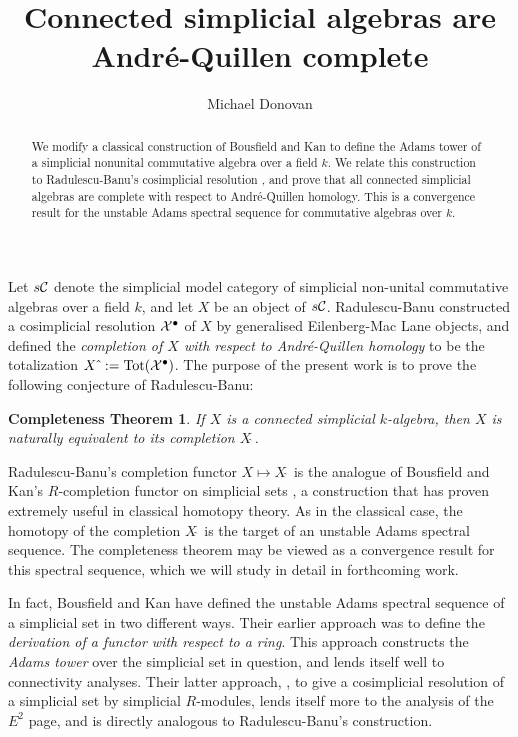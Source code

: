 \documentclass[11pt]{amsart}
\title{Connected simplicial algebras are Andr\'e-Quillen complete}
\author{Michael Donovan}
\theoremstyle{plain}
\newtheorem*{completenesstheorem}{Completeness Theorem}
\begin{document}
\maketitle

\begin{abstract}
We modify a classical construction of Bousfield and Kan \cite{BousKanSSeq.pdf} to define the Adams tower of a simplicial nonunital commutative algebra over a field $k$. We relate this construction to Radulescu-Banu's cosimplicial resolution \cite{Radulescu-Banu.pdf}, and prove that all connected simplicial algebras are complete with respect to Andr\'e-Quillen homology. This is a convergence result for the unstable Adams spectral sequence for commutative algebras over $k$.
\end{abstract}

Let $s\mathcal{C}$ denote the simplicial model category \cite{QuillenHomAlg.pdf} of simplicial non-unital commutative algebras over a field $k$, and let $X$ be an object of $s\mathcal{C}$. Radulescu-Banu \cite{Radulescu-Banu.pdf} constructed a cosimplicial resolution $\mathcal{X}^\bullet$ of $X$ by generalised Eilenberg-Mac Lane objects, and defined the \emph{completion of $X$ with respect to Andr\'e-Quillen homology} to be the totalization $X\hat{\ }:=\textup{Tot}(\mathcal{X}^\bullet)$. The purpose of the present work is to prove the following conjecture of Radulescu-Banu:
\begin{completenesstheorem}\label{completenesstheorem}
If $X$ is a connected simplicial $k$-algebra, then $X$ is naturally equivalent to its completion $X\hat{\ }$.
\end{completenesstheorem}
Radulescu-Banu's completion functor $X\mapsto X\hat{\ }$ is the analogue of Bousfield and Kan's $R$-completion functor on simplicial sets \cite{BousKanSSeq.pdf}, a construction that has proven extremely useful in classical homotopy theory. As in the classical case, the homotopy of the completion $X\hat{\ }$ is the target of an unstable Adams spectral sequence. The completeness theorem may be viewed as a convergence result for this spectral sequence, which we will study in detail in forthcoming work.

In fact, Bousfield and Kan have defined the unstable Adams spectral sequence of a simplicial set in two different ways. Their earlier approach \cite{BK_pairings.pdf} was to define the \emph{derivation of a functor with respect to a ring}. This approach constructs the \emph{Adams tower} over the simplicial set in question, and lends itself well to connectivity analyses. Their latter approach, \cite{BousKanSSeq.pdf}, to give a cosimplicial resolution of a simplicial set by simplicial $R$-modules, lends itself more to the analysis of the $E^2$ page, and is directly analogous to Radulescu-Banu's construction.
\end{document}
